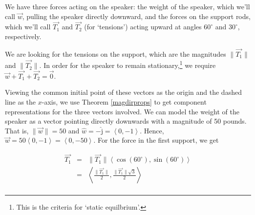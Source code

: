 \documentclass{ximera}
\begin{document}
\begin{example}
\begin{explanation}
\begin{center}
\end{center}

 We have three forces acting on the speaker:  the weight of the speaker, which we'll call  $\overrightarrow{w}$, pulling the speaker directly downward, and the forces on the support rods, which we'll call $\overrightarrow{T_1}$ and $\overrightarrow{T_2}$ (for `tensions') acting upward at angles $60^{\circ}$ and $30^{\circ}$, respectively.  
 
  
 
 We are looking for the tensions on the support, which are the magnitudes  $\| \overrightarrow{T_1} \|$  and  $\| \overrightarrow{T_2} \|$.   In order for the speaker to remain stationary,\footnote{This is the criteria for `static equilbrium'.} we require  $\overrightarrow{w} + \overrightarrow{T_1} + \overrightarrow{T_2} = \overrightarrow{0}$.  
 
  
 
 Viewing the common initial point of these vectors as the origin and the dashed line as the $x$-axis, we use Theorem \ref{magdirprops} to get component representations for the three vectors involved. We can model the weight of the speaker as a vector pointing directly downwards with a magnitude of 50 pounds.  That is,  $\| \overrightarrow{w} \| = 50$ and $\hat{w} = -\hat{\text{j}} = \left<0,-1\right>$.  Hence, $\overrightarrow{w} = 50\left<0,-1\right> = \left<0,-50\right>$.  For the force in the first support, we get
 
\[ \begin{array}{rcl}

 \overrightarrow{T_1} &  = &  \| \overrightarrow{T_1} \|\left<\cos\left(60^{\circ}\right), \sin\left(60^{\circ}\right)\right> \\   
                            & =  & \left< \frac{\| \overrightarrow{T_1} \|}{2} , \frac{\| \overrightarrow{T_1} \|\sqrt{3}}{2}\right> \\ \end{array} \]
                            

\end{explanation}
\end{example}
\end{document}
